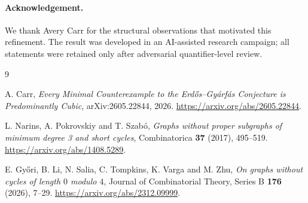 \documentclass[11pt]{article}
\begin{document}
\paragraph{Acknowledgement.}
We thank Avery Carr for the structural observations that motivated this
refinement.  The result was developed in an AI-assisted research campaign;
all statements were retained only after adversarial quantifier-level review.

\enlargethispage{4\baselineskip}
\begin{thebibliography}{9}
\small

A. Carr,
\emph{Every Minimal Counterexample to the Erd\H{o}s--Gy\'arf\'as Conjecture
is Predominantly Cubic},
arXiv:2605.22844, 2026.
\url{https://arxiv.org/abs/2605.22844}.

L. Narins, A. Pokrovskiy and T. Szab\'o,
\emph{Graphs without proper subgraphs of minimum degree 3 and short cycles},
Combinatorica \textbf{37} (2017), 495--519.
\url{https://arxiv.org/abs/1408.5289}.

E. Gy\H{o}ri, B. Li, N. Salia, C. Tompkins, K. Varga and M. Zhu,
\emph{On graphs without cycles of length $0$ modulo $4$},
Journal of Combinatorial Theory, Series B \textbf{176} (2026), 7--29.
\url{https://arxiv.org/abs/2312.09999}.

\end{thebibliography}
\end{document}
